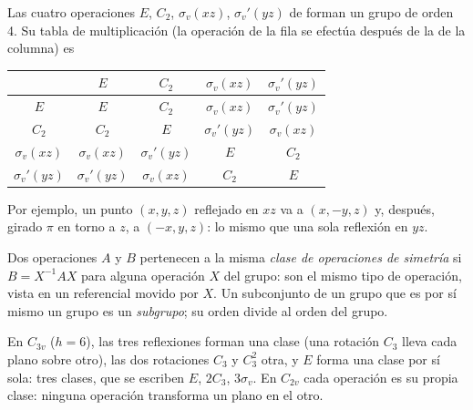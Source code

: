 \begin{example}\label{ex:b3:point-groups:c2v}
Las cuatro operaciones $E$, $C_2$, $\sigma_v(xz)$, $\sigma_v'(yz)$ de  forman un
grupo de orden 4. Su tabla de multiplicación (la operación de la fila se efectúa después de
la de la columna) es
\begin{center}\small
\begin{tabular}{c|cccc}
\hline
 & $E$ & $C_2$ & $\sigma_v(xz)$ & $\sigma_v'(yz)$\\ \hline
$E$ & $E$ & $C_2$ & $\sigma_v(xz)$ & $\sigma_v'(yz)$\\
$C_2$ & $C_2$ & $E$ & $\sigma_v'(yz)$ & $\sigma_v(xz)$\\
$\sigma_v(xz)$ & $\sigma_v(xz)$ & $\sigma_v'(yz)$ & $E$ & $C_2$\\
$\sigma_v'(yz)$ & $\sigma_v'(yz)$ & $\sigma_v(xz)$ & $C_2$ & $E$\\ \hline
\end{tabular}
\end{center}
Por ejemplo, un punto $(x, y, z)$ reflejado en $xz$ va a $(x, -y, z)$ y, después,
girado $\pi$ en torno a $z$, a $(-x, y, z)$: lo mismo que una sola reflexión en
$yz$.
\end{example}

\begin{definition}\label{def:b3:point-groups:class}
Dos operaciones $A$ y $B$ pertenecen a la misma \emph{clase de operaciones de
simetría} si $B = X^{-1}AX$ para alguna
operación $X$ del grupo: son el mismo tipo de operación, vista en un
referencial movido por $X$. Un subconjunto de un grupo que es por sí mismo un grupo es un
\emph{subgrupo}; su orden divide al orden del grupo.
\end{definition}

\begin{example}[Clases de \ce{NH3}]\label{ex:b3:point-groups:classes}
En $C_{3v}$ ($h = 6$), las tres reflexiones forman una clase (una rotación $C_3$
lleva cada plano sobre otro), las dos rotaciones $C_3$ y $C_3^2$ otra,
y $E$ forma una clase por sí sola: tres clases, que se escriben $E$, $2C_3$, $3\sigma_v$. En
$C_{2v}$ cada operación es su propia clase: ninguna operación transforma un plano en
el otro.
\end{example}

